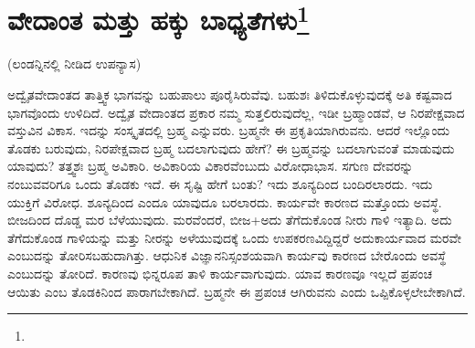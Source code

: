 
\chapter[ವೇದಾಂತ ಮತ್ತು ಹಕ್ಕು ಬಾಧ್ಯತೆಗಳು]{ವೇದಾಂತ ಮತ್ತು ಹಕ್ಕು ಬಾಧ್ಯತೆಗಳು\protect\footnote{}}

\begin{center}
(ಲಂಡನ್ನಿನಲ್ಲಿ ನೀಡಿದ ಉಪನ್ಯಾಸ)
\end{center}

ಅದ್ವೈತವೇದಾಂತದ ತಾತ್ತ್ವಿಕ ಭಾಗವನ್ನು ಬಹುಪಾಲು ಪೂರೈಸಿರುವೆವು. ಬಹುಶಃ ತಿಳಿದುಕೊಳ್ಳುವುದಕ್ಕೆ ಅತಿ ಕಷ್ಟವಾದ ಭಾಗವೊಂದು ಉಳಿದಿದೆ. ಅದ್ವೈತ ವೇದಾಂತದ ಪ್ರಕಾರ ನಮ್ಮ ಸುತ್ತಲಿರುವುದೆಲ್ಲ, ಇಡೀ ಬ್ರಹ್ಮಾಂಡವೆ, ಆ ನಿರಪೇಕ್ಷವಾದ ವಸ್ತುವಿನ ವಿಕಾಸ. ಇದನ್ನು ಸಂಸ್ಕೃತದಲ್ಲಿ ಬ್ರಹ್ಮ ಎನ್ನುವರು. ಬ್ರಹ್ಮನೇ ಈ ಪ್ರಕೃತಿಯಾಗಿರುವನು. ಆದರೆ ಇಲ್ಲೊಂದು ತೊಡಕು ಬರುವುದು, ನಿರಪೇಕ್ಷವಾದ ಬ್ರಹ್ಮ ಬದಲಾಗುವುದು ಹೇಗೆ? ಈ ಬ್ರಹ್ಮವನ್ನು ಬದಲಾಗುವಂತೆ ಮಾಡುವುದು ಯಾವುದು? ತತ್ತ್ವಶಃ ಬ್ರಹ್ಮ ಅವಿಕಾರಿ. ಅವಿಕಾರಿಯ ವಿಕಾರವೆಂಬುದು ವಿರೋಧಾಭಾಸ. ಸಗುಣ ದೇವರನ್ನು ನಂಬುವವರಿಗೂ ಒಂದು ತೊಡಕು ಇದೆ. ಈ ಸೃಷ್ಟಿ ಹೇಗೆ ಬಂತು? ಇದು ಶೂನ್ಯದಿಂದ ಬಂದಿರಲಾರದು. ಇದು ಯುಕ್ತಿಗೆ ವಿರೋಧ. ಶೂನ್ಯದಿಂದ ಎಂದೂ ಯಾವುದೂ ಬರಲಾರದು. ಕಾರ್ಯವೇ ಕಾರಣದ ಮತ್ತೊಂದು ಅವಸ್ಥೆ. ಬೀಜದಿಂದ ದೊಡ್ಡ ಮರ ಬೆಳೆಯುವುದು. ಮರವೆಂದರೆ, ಬೀಜ+ಅದು ತೆಗೆದುಕೊಂಡ ನೀರು ಗಾಳಿ ಇತ್ಯಾದಿ. ಅದು ತೆಗೆದುಕೊಂಡ ಗಾಳಿಯನ್ನು ಮತ್ತು ನೀರನ್ನು ಅಳೆಯುವುದಕ್ಕೆ ಒಂದು ಉಪಕರಣವಿದ್ದಿದ್ದರೆ ಅದು\break ಕಾರ್ಯವಾದ ಮರವೇ ಎಂಬುದನ್ನು ತೋರಿಸಬಹುದಾಗಿತ್ತು. ಆಧುನಿಕ ವಿಜ್ಞಾನ\break ನಿಸ್ಸಂಶಯವಾಗಿ ಕಾರ್ಯವು ಕಾರಣದ ಬೇರೊಂದು ಅವಸ್ಥೆ ಎಂಬುದನ್ನು ತೋರಿದೆ. ಕಾರಣವು ಭಿನ್ನರೂಪ ತಾಳಿ ಕಾರ್ಯವಾಗುವುದು. ಯಾವ ಕಾರಣವೂ ಇಲ್ಲದೆ ಪ್ರಪಂಚ ಆಯಿತು ಎಂಬ ತೊಡಕಿನಿಂದ ಪಾರಾಗಬೇಕಾಗಿದೆ. ಬ್ರಹ್ಮನೇ ಈ ಪ್ರಪಂಚ ಆಗಿರುವನು ಎಂದು ಒಪ್ಪಿಕೊಳ್ಳಲೇಬೇಕಾಗಿದೆ.

